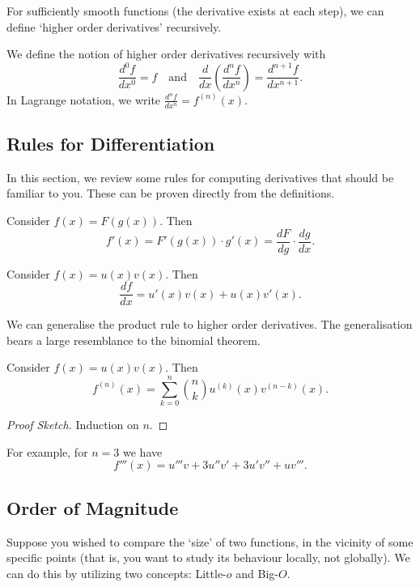 \documentclass[a4]{scrartcl}
\begin{document}
For sufficiently smooth functions (the derivative exists at each step), we can define `higher order derivatives' recursively.

\begin{definition}
	We define the notion of higher order derivatives recursively with
	$$
	\frac{d^0 f}{dx^0} = f \quad \text{and} \quad \frac{d}{dx} \left(\frac{d^n f}{dx^n}\right) = \frac{d^{n + 1} f}{dx^{n + 1}}.
	$$
	In Lagrange notation, we write $\frac{d^n f}{dx^n} = f^{(n)}(x)$.
\end{definition}

\subsection{Rules for Differentiation}

In this section, we review some rules for computing derivatives that should be familiar to you. These can be proven directly from the definitions.

\begin{theorem}
	Consider $f(x) = F(g(x))$. Then
	$$
	f'(x) = F'(g(x)) \cdot g'(x) = \frac{dF}{dg} \cdot \frac{dg}{dx}.
	$$
\end{theorem}

\begin{theorem}
	Consider $f(x) = u(x) v(x)$. Then
	$$
	\frac{df}{dx} = u'(x) v(x) + u(x) v'(x).
	$$
\end{theorem}

We can generalise the product rule to higher order derivatives. The generalisation bears a large resemblance to the binomial theorem.

\begin{theorem}
	Consider $f(x) = u(x) v(x)$. Then
	$$
f^{(n)}(x) = \sum_{k = 0}^{n} \binom{n}{k} u^{(k)}(x) v^{(n - k)} (x).
	$$
\end{theorem}
\begin{proof}[Proof Sketch]
	Induction on $n$.
\end{proof}

For example, for $n = 3$ we have
$$
f'''(x) = u'''v + 3 u'' v' + 3 u' v'' + u v'''.
$$

\subsection{Order of Magnitude}

Suppose you wished to compare the `size' of two functions, in the vicinity of some specific points (that is, you want to study its behaviour locally, not globally). 
We can do this by utilizing two concepts: Little-$o$ and Big-$O$.
\end{document}
